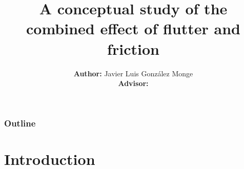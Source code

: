 \documentclass[dvipsnames, aspectratio = 169]{beamer}
\title[Master's Thesis]{A conceptual study of the combined effect of flutter and friction}
\author[Javier Luis González Monge]{\textbf{Author:} Javier Luis González Monge\\
{\small \textbf{Advisor:} }}
\institute[]{\large Máster Universitario en Sistemas Espaciales \\
	{\large Technical University of Madrid}}
\begin{document}
\begin{frame}
	\maketitle
\end{frame}


\begin{frame}
	\frametitle{Outline}
	\tableofcontents
\end{frame}

\section{Introduction}

\end{document}
